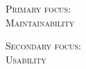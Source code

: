 \begin{titlepage}
\begin{center}
\begin{minipage}{0.4\textwidth}
\begin{flushleft} \large
\textsc{Primary focus:}\\
\textsc{Maintainability}\\

\end{flushleft}
\end{minipage}
\begin{minipage}{0.4\textwidth}
\begin{flushright} \large
\textsc{Secondary focus:}\\
\textsc{Usability}
\end{flushright}
\end{minipage}



\vfill


\end{center}

\end{titlepage}
